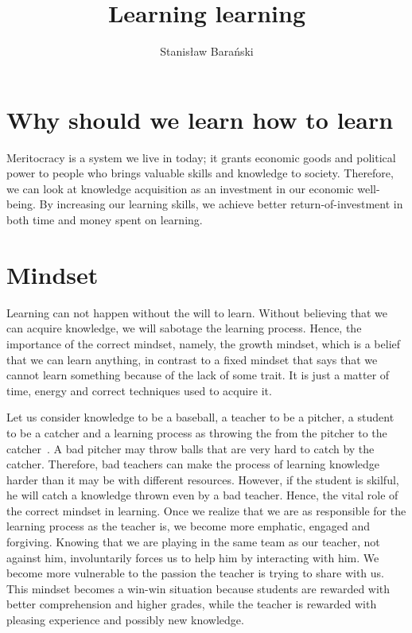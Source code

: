 \documentclass{article}
\title{Learning learning}
\author{Stanisław Barański}
\begin{document}
\maketitle

\section{Why should we learn how to learn}
Meritocracy is a system we live in today; it grants economic goods and political power to people who brings valuable skills and knowledge to society. Therefore, we can look at knowledge acquisition as an investment in our economic well-being. By increasing our learning skills, we achieve better return-of-investment in both time and money spent on learning. 

\section{Mindset}
Learning can not happen without the will to learn. Without believing that we can acquire knowledge, we will sabotage the learning process. Hence, the importance of the correct mindset, namely, the growth mindset, which is a belief that we can learn anything, in contrast to a fixed mindset that says that we cannot learn something because of the lack of some trait. It is just a matter of time, energy and correct techniques used to acquire it. 

Let us consider knowledge to be a baseball, a teacher to be a pitcher, a student to be a catcher and a learning process as throwing the from the pitcher to the catcher~\cite{adler2014read}. A bad pitcher may throw balls that are very hard to catch by the catcher. Therefore, bad teachers can make the process of learning knowledge harder than it may be with different resources. However, if the student is skilful, he will catch a knowledge thrown even by a bad teacher. Hence, the vital role of the correct mindset in learning. Once we realize that we are as responsible for the learning process as the teacher is, we become more emphatic, engaged and forgiving. Knowing that we are playing in the same team as our teacher, not against him, involuntarily forces us to help him by interacting with him. We become more vulnerable to the passion the teacher is trying to share with us. This mindset becomes a win-win situation because students are rewarded with better comprehension and higher grades, while the teacher is rewarded with pleasing experience and possibly new knowledge.
\end{document}
